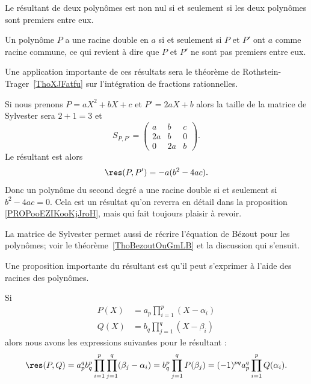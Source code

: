 \begin{proposition} \label{PropAPxzcUl}
	Le résultant de deux polynômes est non nul si et seulement si les deux polynômes sont premiers entre eux.
\end{proposition}

Un polynôme \( P\) a une racine double en \( a\) si et seulement si \( P\) et \( P'\) ont \( a\) comme racine commune, ce qui revient à dire que \( P\) et \( P'\) ne sont pas premiers entre eux.

Une application importante de ces résultats sera le théorème de Rothstein-Trager~\ref{ThoXJFatfu} sur l'intégration de fractions rationnelles.

\begin{example}
	Si nous prenons \( P=aX^2+bX+c\) et \( P'=2aX+b\) alors la taille de la matrice de Sylvester sera \( 2+1=3\) et
	\begin{equation}
		S_{P,P'}=\begin{pmatrix}
			a  & b  & c \\
			2a & b  & 0 \\
			0  & 2a & b
		\end{pmatrix}.
	\end{equation}
	Le résultant est alors
	\begin{equation}
		\res(P,P')=-a(b^2-4ac).
	\end{equation}
	Donc un polynôme du second degré a une racine double si et seulement si \( b^2-4ac=0\). Cela est un résultat qu'on reverra en détail dans la proposition \ref{PROPooEZIKooKjJroH}, mais qui fait toujours plaisir à revoir.
\end{example}

La matrice de Sylvester permet aussi de récrire l'équation de Bézout pour les polynômes; voir le théorème~\ref{ThoBezoutOuGmLB} et la discussion qui s'ensuit.

Une proposition importante du résultant est qu'il peut s'exprimer à l'aide des racines des polynômes.
\begin{proposition} \label{PropNDBOGNx}
	Si
	\begin{subequations}
		\begin{align}
			P(X) & =a_p\prod_{i=1}^p(X-\alpha_i) \\
			Q(X) & =b_q\prod_{j=1}^q(X-\beta_i)
		\end{align}
	\end{subequations}
	alors nous avons les expressions suivantes pour le résultant :
	\begin{equation}        \label{EqCFUumjx}
		\res(P,Q)=a_p^qb_q^p\prod_{i=1}^p\prod_{j=1}^q(\beta_j-\alpha_i)=b_q^p\prod_{j=1}^qP(\beta_j)=(-1)^{pq}a_p^q\prod_{i=1}^pQ(\alpha_i).
	\end{equation}
\end{proposition}

